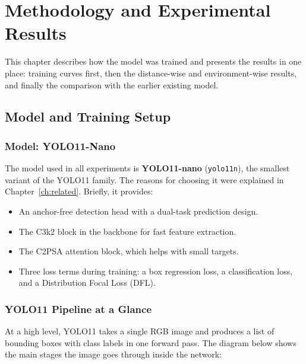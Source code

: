 \documentclass[12pt,a4paper]{report}
\begin{document}
\chapter{Methodology and Experimental Results}
\label{ch:expts}

This chapter describes how the model was trained and presents the results in
one place: training curves first, then the distance-wise and environment-wise
results, and finally the comparison with the earlier existing model.

\section{Model and Training Setup}

\subsection{Model: YOLO11-Nano}
The model used in all experiments is \textbf{YOLO11-nano} (\texttt{yolo11n}),
the smallest variant of the YOLO11 family. The reasons for choosing it were
explained in Chapter~\ref{ch:related}. Briefly, it provides:
\begin{itemize}[noitemsep]
    \item An anchor-free detection head with a dual-task prediction design.
    \item The C3k2 block in the backbone for fast feature extraction.
    \item The C2PSA attention block, which helps with small targets.
    \item Three loss terms during training: a box regression loss, a
          classification loss, and a Distribution Focal Loss (DFL).
\end{itemize}

\subsection{YOLO11 Pipeline at a Glance}
At a high level, YOLO11 takes a single RGB image and produces a list of
bounding boxes with class labels in one forward pass. The diagram below shows
the main stages the image goes through inside the network:
\end{document}

